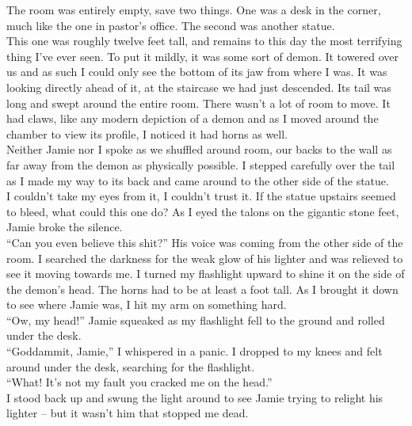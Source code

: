 \documentclass[a5paper]{scrartcl}
\begin{document}
The room was entirely empty, save two things. One was a desk in the corner, much like the one in pastor's office. The second was another statue. \\


This one was roughly twelve feet tall, and remains to this day the most terrifying thing I've ever seen. To put it mildly, it was some sort of demon. It towered over us and as such I could only see the bottom of its jaw from where I was. It was looking directly ahead of it, at the staircase we had just descended. Its tail was long and swept around the entire room. There wasn't a lot of room to move. It had claws, like any modern depiction of a demon and as I moved around the chamber to view its profile, I noticed it had horns as well. \\


Neither Jamie nor I spoke as we shuffled around room, our backs to the wall as far away from the demon as physically possible. I stepped carefully over the tail as I made my way to its back and came around to the other side of the statue. \\


I couldn't take my eyes from it, I couldn't trust it. If the statue upstairs seemed to bleed, what could this one do? As I eyed the talons on the gigantic stone feet, Jamie broke the silence.\\


\enquote{Can you even believe this shit?} His voice was coming from the other side of the room. I searched the darkness for the weak glow of his lighter and was relieved to see it moving towards me. I turned my flashlight upward to shine it on the side of the demon's head. The horns had to be at least a foot tall. As I brought it down to see where Jamie was, I hit my arm on something hard.\\


\enquote{Ow, my head!} Jamie squeaked as my flashlight fell to the ground and rolled under the desk.\\


\enquote{Goddammit, Jamie,} I whispered in a panic. I dropped to my knees and felt around under the desk, searching for the flashlight. \\


\enquote{What! It's not my fault you cracked me on the head.} \\


I stood back up and swung the light around to see Jamie trying to relight his lighter – but it wasn't him that stopped me dead. \\
\end{document}
